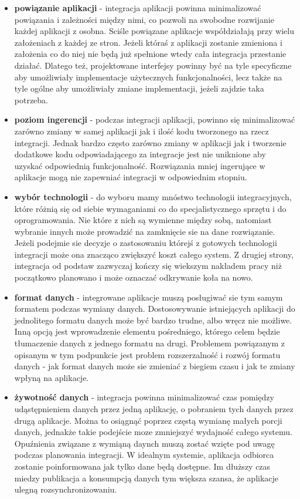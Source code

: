 \begin{itemize}
	\item \textbf{powiązanie aplikacji} - integracja aplikacji powinna minimalizować powiązania i zależności między nimi, co pozwoli na swobodne rozwijanie każdej aplikacji z osobna. Sciśle powiązane aplikacje współdziałają przy wielu założeniach z każdej ze stron. Jeżeli któraś z aplikacji zostanie zmieniona i założenia co do niej nie będą już spełnione wtedy cała integracja przestanie działać. Dlatego też, projektowane interfejsy powinny być na tyle specyficzne aby umożliwiały implementacje użytecznych funkcjonalności, lecz także na tyle ogólne aby umożliwiały zmiane implementacji, jeżeli zajdzie taka potrzeba.
	\item \textbf{poziom ingerencji} - podczas integracji aplikacji, powinno się minimalizować zarówno zmiany w samej aplikacji jak i ilość kodu tworzonego na rzecz integracji. Jednak bardzo często zarówno zmiany w aplikacji jak i tworzenie dodatkowe kodu odpowiadającego za integracje jest nie uniknione aby uzyskać odpowiednią funkcjonalność. Rozwiązania mniej ingerujące w aplikacje mogą nie zapewniać integracji w odpowiednim stopniu.
	\item \textbf{wybór technologii} - do wyboru mamy mnóstwo technologii integracyjnych, które różnią się od siebie wymaganiami co do specjalistycznego sprzętu i do oprogramowania. Nie które z nich są wymienne między sobą, natomiast wybranie innych może prowadzić na zamknięcie sie na dane rozwiązanie. Jeżeli podejmie sie decyzje o zastosowaniu którejś z gotowych technologii integracji może ona znacząco zwiększyć koszt całego system. Z drugiej strony, integracja od podstaw zazwyczaj kończy się wiekszym nakładem pracy niż początkowo planowano i może oznaczać odkrywanie koła na nowo.
	\item \textbf{format danych} - integrowane aplikacje muszą posługiwać sie tym samym formatem podczas wymiany danych. Dostosowywanie istniejących aplikacji do jednolitego formatu danych może być bardzo trudne, albo wręcz nie możliwe. Inną opcją jest wprowadzenie elementu pośredniego, którego celem będzie tłumaczenie danych z jednego formatu na drugi. Problemem powiązanym z opisanym w tym podpunkcie jest problem rozszerzalność i rozwój formatu danych - jak format danych może sie zmieniać z biegiem czasu i jak te zmiany wpłyną na aplikacje.
	\item \textbf{żywotność danych} - integracja powinna minimalizować czas pomiędzy udąstępnieniem danych przez jedną aplikację, o pobraniem tych danych przez drugą aplikacje. Można to osiągnąć poprzez częstą wymianę małych porcji danych, jednakże takie podejście moze zmniejszyć wydajność całego systemu. Opuźnienia związane z wymiąną daynch muszą zostać wzięte pod uwagę podczas planowania integracji. W idealnym systemie, aplikacja odbiorca zostanie poinformowana jak tylko dane będą dostępne. Im dłuższy czas miedzy publikacja a konsumpcją danych tym większa szansa, że aplikacje ulegną rozsynchronizowaniu.

\end{itemize}
